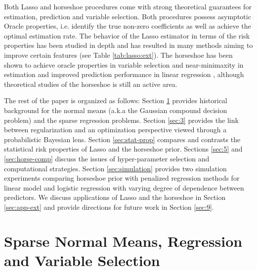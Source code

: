 \documentclass[sts,preprint]{imsart}
\begin{document}
Both Lasso and horseshoe procedures come with strong theoretical guarantees for estimation, prediction and variable selection. {Both procedures possess asymptotic Oracle properties, i.e. identify the true non-zero coefficients as well as achieve the optimal estimation rate.} The behavior of the Lasso estimator in terms of the risk properties has been studied in depth and has resulted in many methods aiming to improve certain features (see Table \ref{tab:lasso:ext}). The horseshoe has been shown to achieve oracle properties in variable selection \citep{datta2013asymptotic} and near-minimaxity in estimation \citep{van2017adaptive} and improved prediction performance in linear regression \citep{bhadra2016prediction}, although theoretical studies of the horseshoe is still an active area. 


The rest of the paper is organized as follows: Section \ref{sec:2} provides historical background for the normal means (a.k.a the Gaussian compound decision problem) and the sparse regression problems. Section \ref{sec:3} provides the link between regularization and an optimization perspective viewed through a probabilistic Bayesian lens. Section \ref{sec:stat-prop} compares and contrasts the statistical risk properties of Lasso and the horseshoe prior. Sections \ref{sec:5} and \ref{sec:horse-comp} discuss the issues of hyper-parameter selection and computational strategies. Section \ref{sec:simulation} provides two simulation experiments comparing horseshoe prior with penalized regression methods for linear model and logistic regression with varying degree of dependence between predictors. We discuss applications of Lasso and the horseshoe in Section \ref{sec:app-ext} and provide directions for future work in Section \ref{sec:9}. 


\section{Sparse Normal Means, Regression and Variable Selection}\label{sec:2}
\end{document}
